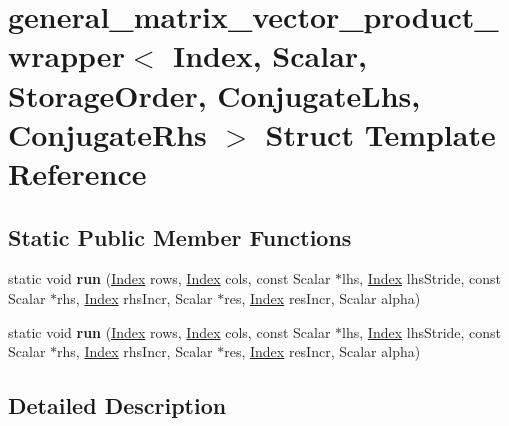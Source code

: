 \hypertarget{structgeneral__matrix__vector__product__wrapper}{}\section{general\+\_\+matrix\+\_\+vector\+\_\+product\+\_\+wrapper$<$ Index, Scalar, Storage\+Order, Conjugate\+Lhs, Conjugate\+Rhs $>$ Struct Template Reference}
\label{structgeneral__matrix__vector__product__wrapper}
\subsection*{Static Public Member Functions}
\begin{DoxyCompactItemize}
\item 
\mbox{\label{structgeneral__matrix__vector__product__wrapper_a96b6b39f3a5468dde9874883ffee1048}} 
static void {\bfseries run} (\hyperlink{namespace_eigen_a62e77e0933482dafde8fe197d9a2cfde}{Index} rows, \hyperlink{namespace_eigen_a62e77e0933482dafde8fe197d9a2cfde}{Index} cols, const Scalar $\ast$lhs, \hyperlink{namespace_eigen_a62e77e0933482dafde8fe197d9a2cfde}{Index} lhs\+Stride, const Scalar $\ast$rhs, \hyperlink{namespace_eigen_a62e77e0933482dafde8fe197d9a2cfde}{Index} rhs\+Incr, Scalar $\ast$res, \hyperlink{namespace_eigen_a62e77e0933482dafde8fe197d9a2cfde}{Index} res\+Incr, Scalar alpha)
\item 
\mbox{\label{structgeneral__matrix__vector__product__wrapper_a96b6b39f3a5468dde9874883ffee1048}} 
static void {\bfseries run} (\hyperlink{namespace_eigen_a62e77e0933482dafde8fe197d9a2cfde}{Index} rows, \hyperlink{namespace_eigen_a62e77e0933482dafde8fe197d9a2cfde}{Index} cols, const Scalar $\ast$lhs, \hyperlink{namespace_eigen_a62e77e0933482dafde8fe197d9a2cfde}{Index} lhs\+Stride, const Scalar $\ast$rhs, \hyperlink{namespace_eigen_a62e77e0933482dafde8fe197d9a2cfde}{Index} rhs\+Incr, Scalar $\ast$res, \hyperlink{namespace_eigen_a62e77e0933482dafde8fe197d9a2cfde}{Index} res\+Incr, Scalar alpha)
\end{DoxyCompactItemize}


\subsection{Detailed Description}
